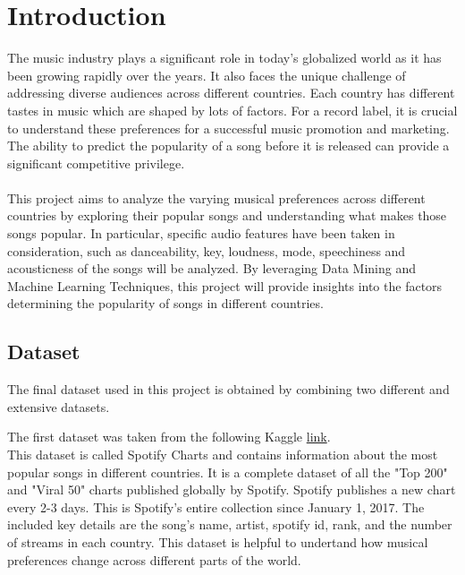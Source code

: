 \chapter{Introduction}

The music industry plays a significant role in today’s globalized world as it has been growing rapidly over the years. It also faces the unique challenge of addressing diverse audiences across
different countries. Each country has different tastes in music which are shaped
by lots of factors. For a record label, it is crucial to understand these preferences for a successful music promotion and marketing. The ability to predict
the popularity of a song before it is released can provide a significant 
competitive privilege.\\
\\
This project aims to analyze the varying musical preferences across different countries by 
exploring their popular songs and understanding what makes those songs popular. In particular, specific audio features have been taken in consideration,  
such as danceability, key, loudness, mode, speechiness and acousticness of the songs will be analyzed. 
By leveraging Data Mining and Machine Learning Techniques, this project will provide insights into
the factors determining the popularity of songs in different countries.\\


\section{Dataset}
The final dataset used in this project is obtained by combining two different and extensive datasets.

The first dataset was taken from the following Kaggle \href{https://www.kaggle.com/datasets/dhruvildave/spotify-charts/data} {link}. \\

This dataset is called Spotify Charts and contains information about the most popular songs in different countries. It is a complete dataset 
of all the "Top 200" and "Viral 50" charts published globally by Spotify. Spotify publishes a new chart
 every 2-3 days. This is Spotify's entire collection since January 1, 2017.
 The included key details are the song's name, artist, spotify id, rank, and the number of streams 
 in each country. This dataset is helpful to undertand how musical preferences change across different
 parts of the world. \\

